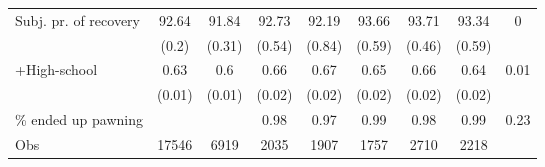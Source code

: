 \begin{tabular}{lcccccccc}
Subj. pr. of recovery & 92.64 & 91.84 & 92.73 & 92.19 & 93.66 & 93.71 & 93.34 & 0 \\
      & (0.2) & (0.31) & (0.54) & (0.84) & (0.59) & (0.46) & (0.59) &  \\
+High-school & 0.63  & 0.6   & 0.66  & 0.67  & 0.65  & 0.66  & 0.64  & 0.01 \\
      & (0.01) & (0.01) & (0.02) & (0.02) & (0.02) & (0.02) & (0.02) &  \\
\% ended up pawning &       &       & 0.98  & 0.97  & 0.99  & 0.98  & 0.99  & 0.23 \\
\midrule
Obs   & 17546 & 6919  & 2035  & 1907  & 1757  & 2710  & 2218  &  \\
\bottomrule
\bottomrule
\end{tabular}%
